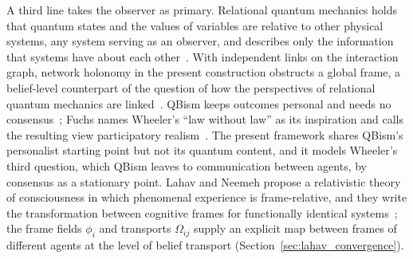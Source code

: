\documentclass[11pt]{article}
\begin{document}
A third line takes the observer as primary. Relational quantum mechanics holds that quantum states and the values of variables are relative to other physical systems, any system serving as an observer, and describes only the information that systems have about each other~\cite{Rovelli1996}. With independent links on the interaction graph, network holonomy in the present construction obstructs a global frame, a belief-level counterpart of the question of how the perspectives of relational quantum mechanics are linked~\cite{AdlamRovelli2022}. QBism keeps outcomes personal and needs no consensus~\cite{Fuchs2014, DeBrotaFuchsSchack2020}; Fuchs names Wheeler's ``law without law'' as its inspiration and calls the resulting view participatory realism~\cite{Fuchs2017}. The present framework shares QBism's personalist starting point but not its quantum content, and it models Wheeler's third question, which QBism leaves to communication between agents, by consensus as a stationary point. Lahav and Neemeh propose a relativistic theory of consciousness in which phenomenal experience is frame-relative, and they write the transformation between cognitive frames for functionally identical systems~\cite{LahavNeemeh2022, LahavNeemeh2025}; the frame fields $\phi_i$ and transports $\Omega_{ij}$ supply an explicit map between frames of different agents at the level of belief transport (Section~\ref{sec:lahav_convergence}).
\end{document}
